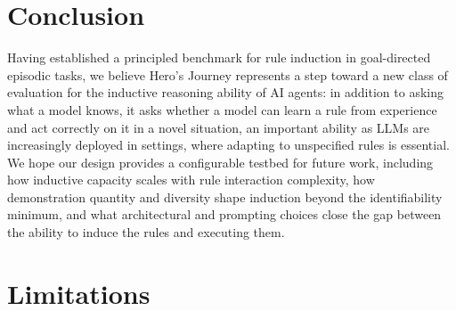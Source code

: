 \documentclass[11pt]{article}
\newcommand{\AS}{{\sc Hero's Journey}\xspace}
\begin{document}
\section{Conclusion}



 Having established a principled benchmark for rule induction in goal-directed episodic tasks,  we believe \AS represents a step toward a new class of evaluation for the inductive reasoning ability of AI agents: in addition to asking what a model knows, it asks  
  whether a model can learn a rule from experience and act correctly on it in a novel situation, an important ability as LLMs are increasingly deployed in settings, where adapting to unspecified rules is essential. We hope our design provides a configurable testbed for future work, including how inductive capacity scales with rule interaction complexity, how demonstration  quantity and diversity shape induction beyond the identifiability minimum, and what architectural and prompting choices close the gap between the ability to induce the rules and
  executing them.

\section{Limitations}
\label{sec:limitations}
\end{document}
